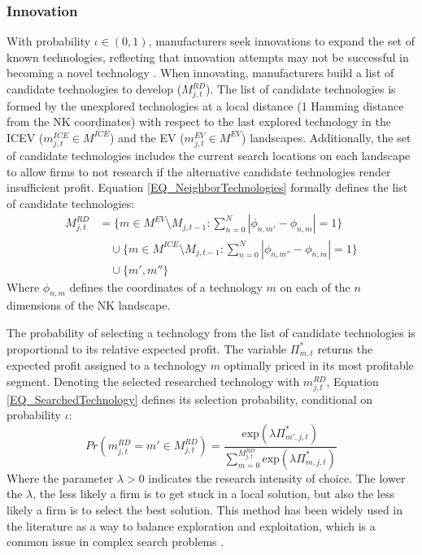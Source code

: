\documentclass[12pt]{article}
\begin{document}
	\subsubsection{Innovation} \label{Supply:Innovation}
	With probability $\iota\in(0,1)$, manufacturers seek innovations to expand the set of known technologies, reflecting that innovation attempts may not be successful in becoming a novel technology \citep{nelson1977search, Dosi2010}. When innovating, manufacturers build a list of candidate technologies to develop ($M^{RD}_{j,t}$). The list of candidate technologies is formed by the unexplored technologies at a local distance (1 Hamming distance from the NK coordinates) with respect to the last explored technology in the ICEV ($m^{ICE}_{j,t}\in{M^{ICE}}$) and the EV ($m^{EV}_{j,t}\in{M^{EV}}$) landscapes. Additionally, the set of candidate technologies includes the current search locations on each landscape to allow firms to not research if the alternative candidate technologies render insufficient profit. Equation \ref{EQ_NeighborTechnologies} formally defines the list of candidate technologies:
	\begin{equation}
		\begin{aligned}
			M^{RD}_{j,t} &=
			\big\{ m \in M^{EV} \setminus M_{j,t-1} : \sum_{n=0}^{N} |\phi_{n,m'} - \phi_{n,m}| = 1 \big\} \\
			&\quad \cup \big\{ m \in M^{ICE} \setminus M_{j,t-1} : \sum_{n=0}^{N} |\phi_{n,m''} - \phi_{n,m}| = 1 \big\} \\
			&\quad \cup\{m',m''\}
		\end{aligned}
		\label{EQ_NeighborTechnologies}
	\end{equation}
	Where $\phi_{n,m}$ defines the coordinates of a technology $m$ on each of the $n$ dimensions of the NK landscape.

	The probability of selecting a technology from the list of candidate technologies is proportional to its relative expected profit. The variable $\Pi^*_{m,t}$ returns the expected profit assigned to a technology $m$ optimally priced in its most profitable segment. Denoting the selected researched technology with $m^{RD}_{j,t}$, Equation \ref{EQ_SearchedTechnology} defines its selection probability, conditional on probability $\iota$:
	\begin{equation}
		Pr(m^{RD}_{j,t}=m'\in{M^{RD}_{j,t}}) =\frac{ \text{exp}(\lambda \Pi^*_{m',j,t})}{\sum_{m=0}^{M^{RD}_{j,t}} \text{exp}(\lambda \Pi^*_{m,j,t})}
		\label{EQ_SearchedTechnology}
	\end{equation}
	Where the parameter $\lambda>0$ indicates the research intensity of choice. The lower the $\lambda$, the less likely a firm is to get stuck in a local solution, but also the less likely a firm is to select the best solution. This method has been widely used in the literature as a way to balance exploration and exploitation, which is a common issue in complex search problems \citep{Puranam2015}.
\end{document}
